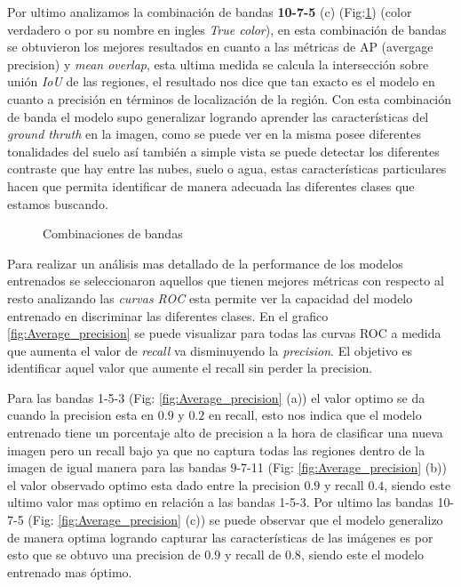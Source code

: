 Por ultimo analizamos la combinación de bandas \textbf{10-7-5} (c) (Fig:\ref{fig:COMB_BANDAS}) (color verdadero o por su nombre en ingles \textit{True color}), en esta combinación de bandas se obtuvieron los mejores resultados en cuanto a las métricas de AP (avergage precision) y  \textit{mean overlap}, esta ultima medida se calcula la intersección sobre unión \textit{IoU} de las regiones, el resultado nos dice que tan exacto es el modelo en cuanto a precisión en términos de localización de la región. Con esta combinación de banda el modelo supo generalizar logrando aprender las características del \textit{ground thruth} en la imagen, como se puede ver en la misma posee diferentes tonalidades del suelo así también a simple vista se puede detectar los diferentes contraste que hay entre las nubes, suelo o agua, estas características particulares hacen que permita identificar de manera adecuada las diferentes clases que estamos buscando.

\begin{figure}[htbp]
\centering
{}
\caption{Combinaciones de bandas} \label{fig:COMB_BANDAS}
\end{figure}

Para realizar un análisis mas detallado de la performance de los modelos entrenados se seleccionaron aquellos que tienen mejores métricas con respecto al resto analizando las \textit{curvas ROC} esta permite ver la capacidad del modelo entrenado en discriminar las diferentes clases. En el grafico \ref{fig:Average_precision} se puede visualizar para todas las curvas ROC a medida que aumenta el valor de \textit{recall} va disminuyendo la \textit{precision}. El objetivo es identificar aquel valor que aumente el recall sin perder la precision.

Para las bandas 1-5-3 (Fig: \ref{fig:Average_precision} (a)) el valor optimo se da cuando la precision esta en $0.9$ y $0.2$ en recall, esto nos indica que el modelo entrenado tiene un porcentaje alto de precision a la hora de clasificar una nueva imagen pero un recall bajo ya que no captura todas las regiones dentro de la imagen de igual manera para las bandas 9-7-11 (Fig: \ref{fig:Average_precision} (b)) el valor observado optimo esta dado entre la precision $0.9$ y recall $0.4$, siendo este ultimo valor mas optimo en relación a las bandas 1-5-3. Por ultimo las bandas 10-7-5 (Fig: \ref{fig:Average_precision} (c)) se puede observar que el modelo generalizo de manera optima logrando capturar las características de las imágenes es por esto que se obtuvo una precision de $0.9$ y recall  de $0.8$, siendo este el modelo entrenado mas óptimo. 

